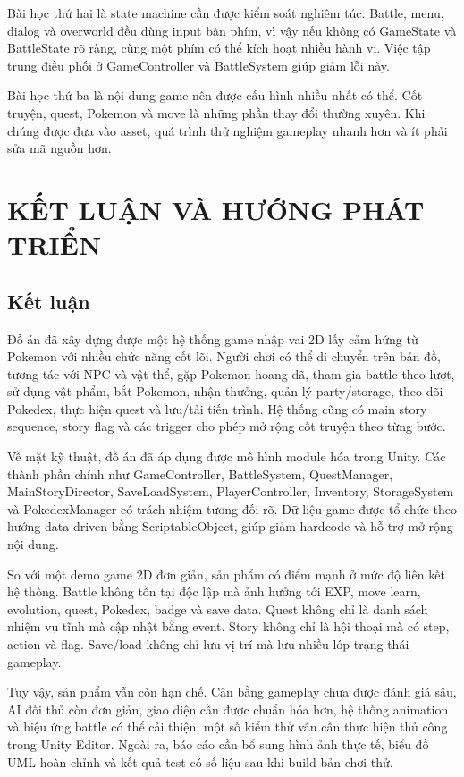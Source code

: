 Bài học thứ hai là state machine cần được kiểm soát nghiêm túc. Battle, menu, dialog và overworld đều dùng input bàn phím, vì vậy nếu không có GameState và BattleState rõ ràng, cùng một phím có thể kích hoạt nhiều hành vi. Việc tập trung điều phối ở GameController và BattleSystem giúp giảm lỗi này.

Bài học thứ ba là nội dung game nên được cấu hình nhiều nhất có thể. Cốt truyện, quest, Pokemon và move là những phần thay đổi thường xuyên. Khi chúng được đưa vào asset, quá trình thử nghiệm gameplay nhanh hơn và ít phải sửa mã nguồn hơn.

\chapter{KẾT LUẬN VÀ HƯỚNG PHÁT TRIỂN}

\section{Kết luận}

Đồ án đã xây dựng được một hệ thống game nhập vai 2D lấy cảm hứng từ Pokemon với nhiều chức năng cốt lõi. Người chơi có thể di chuyển trên bản đồ, tương tác với NPC và vật thể, gặp Pokemon hoang dã, tham gia battle theo lượt, sử dụng vật phẩm, bắt Pokemon, nhận thưởng, quản lý party/storage, theo dõi Pokedex, thực hiện quest và lưu/tải tiến trình. Hệ thống cũng có main story sequence, story flag và các trigger cho phép mở rộng cốt truyện theo từng bước.

Về mặt kỹ thuật, đồ án đã áp dụng được mô hình module hóa trong Unity. Các thành phần chính như GameController, BattleSystem, QuestManager, MainStoryDirector, SaveLoadSystem, PlayerController, Inventory, StorageSystem và PokedexManager có trách nhiệm tương đối rõ. Dữ liệu game được tổ chức theo hướng data-driven bằng ScriptableObject, giúp giảm hardcode và hỗ trợ mở rộng nội dung.

So với một demo game 2D đơn giản, sản phẩm có điểm mạnh ở mức độ liên kết hệ thống. Battle không tồn tại độc lập mà ảnh hưởng tới EXP, move learn, evolution, quest, Pokedex, badge và save data. Quest không chỉ là danh sách nhiệm vụ tĩnh mà cập nhật bằng event. Story không chỉ là hội thoại mà có step, action và flag. Save/load không chỉ lưu vị trí mà lưu nhiều lớp trạng thái gameplay.

Tuy vậy, sản phẩm vẫn còn hạn chế. Cân bằng gameplay chưa được đánh giá sâu, AI đối thủ còn đơn giản, giao diện cần được chuẩn hóa hơn, hệ thống animation và hiệu ứng battle có thể cải thiện, một số kiểm thử vẫn cần thực hiện thủ công trong Unity Editor. Ngoài ra, báo cáo cần bổ sung hình ảnh thực tế, biểu đồ UML hoàn chỉnh và kết quả test có số liệu sau khi build bản chơi thử.

